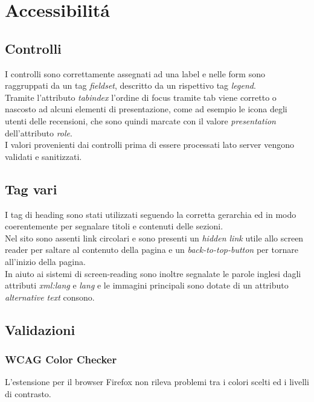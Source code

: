 \section{Accessibilitá}

\subsection{Controlli}
I controlli sono correttamente assegnati ad una label e nelle form sono raggruppati da un tag \textit{fieldset}, descritto da un rispettivo tag \textit{legend}.\\
Tramite l'attributo \textit{tabindex} l'ordine di focus tramite tab viene corretto o nascosto ad alcuni elementi di presentazione, come ad esempio le icona degli utenti delle recensioni, che sono quindi marcate con il valore \textit{presentation} dell'attributo \textit{role}.\\
I valori provenienti dai controlli prima di essere processati lato server vengono validati e sanitizzati.

\subsection{Tag vari}
I tag di heading sono stati utilizzati seguendo la corretta gerarchia ed in modo coerentemente per segnalare titoli e contenuti delle sezioni.\\
Nel sito sono assenti link circolari e sono presenti un \textit{hidden link} utile allo screen reader per saltare al contenuto della pagina e un \textit{back-to-top-button} per tornare all'inizio della pagina.\\
In aiuto ai sistemi di screen-reading sono inoltre segnalate le parole inglesi dagli attributi \textit{xml:lang} e \textit{lang} e le immagini principali sono dotate di un attributo \textit{alternative text} consono.

\subsection{Validazioni}


\subsubsection{WCAG Color Checker}
L'estensione per il browser Firefox non rileva problemi tra i colori scelti ed i livelli di contrasto.

